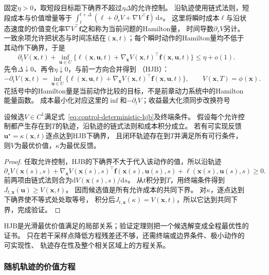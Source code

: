 固定$\eta>0$，取短段目标距下确界不超过$\eta\Delta$的允许控制。
沿轨迹使用链式法则，短段成本与价值增量等于
$\int_t^{t+\Delta}(\ell+\partial_sV+\nabla V^\top\bm f)\,\mathrm ds$。
这里将瞬时成本$\ell$与沿状态速度的价值变化率$\nabla V^\top\bm f$之和称为当前问题的Hamilton量，
时间导数$\partial_sV$另计。
一致余项允许把状态与时间冻结在$(\bm x,t)$；每个瞬时动作的Hamilton量均不低于
其动作下确界，于是
\[
  \partial_tV(\bm x,t)+
  \inf_{\bm u\in U}\{\ell(\bm x,\bm u,t)+
    \nabla_{\bm x}V(\bm x,t)^\top\bm f(\bm x,\bm u,t)\}
  \leq\eta+o(1).
\]
先令$\Delta\downarrow0$、再令$\eta\downarrow0$，与前一方向合并得到
（HJB）：
\begin{equation}
  -\partial_tV(\bm x,t)=
  \inf_{\bm u\in U}
    \{\ell(\bm x,\bm u,t)+
      \nabla_{\bm x}V(\bm x,t)^\top\bm f(\bm x,\bm u,t)\},
  \qquad V(\bm x,T)=\phi(\bm x).
  \label{eq:control-deterministic-hjb}
\end{equation}
花括号中的Hamilton量是当前动作比较的目标，不是前章动力系统中的Hamilton能量函数。
成本最小化对应这里的$\inf$和$-\partial_tV$；收益最大化须同步改换符号

\begin{theorem}[确定性HJB验证定理]
\label{thm:control-hjb-verification}
设候选$V\in C^1$满足式~\eqref{eq:control-deterministic-hjb}及终端条件。
假设每个允许控制都产生存在到$T$的轨迹，沿轨迹的链式法则和成本积分成立。
若有可实现反馈$\bm u^\star=\kappa(\bm x,t)$逐点达到HJB下确界，
且闭环轨迹存在到$T$并满足所有可行条件，则$V$为最优价值，$\kappa$为最优反馈。
\end{theorem}
\begin{proof}
任取允许控制，HJB的下确界不大于代入该动作的值，所以沿轨迹
\[
  \partial_sV(\bm x(s),s)+
  \nabla_{\bm x}V(\bm x(s),s)^\top
    \bm f(\bm x(s),\bm u(s),s)
  +\ell(\bm x(s),\bm u(s),s)\geq0.
\]
前两项由链式法则合为$\mathrm dV(\bm x(s),s)/\mathrm ds$。
从$t$积分到$T$，用终端条件得到$J_{t,\bm x}(\bm u)\geq V(\bm x,t)$。
因而候选值是所有允许成本的共同下界。
对$\kappa$，逐点达到下确界使不等式处处取等号，
积分后$J_{t,\bm x}(\kappa)=V(\bm x,t)$，所以它达到共同下界，完成验证。
\end{proof}
HJB是光滑最优价值满足的局部关系；验证定理则把一个候选解变成全程最优性的证书。
只在若干采样点降低方程残差还不够，还需终端或边界条件、极小动作的可实现性、
轨迹存在性及整个相关区域上的方程关系。

\subsubsection{随机轨迹的价值方程}

